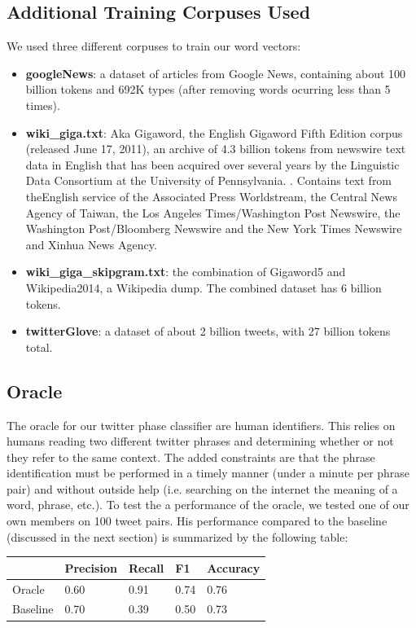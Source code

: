 \documentclass[conference]{IEEEtran}
\begin{document}
\subsection{Additional Training Corpuses Used}
We used three different corpuses to train our word vectors:\\
\begin{itemize}
\item \textbf{googleNews}: a dataset of articles from Google News, containing about 100 billion tokens and  692K types (after removing words ocurring less than 5 times). \cite{GloVe}
\item \textbf{wiki\_giga.txt}: Aka Gigaword, the English Gigaword Fifth Edition corpus (released June 17, 2011), an archive of 4.3 billion tokens from newswire text data in English that has been acquired over several years by the Linguistic Data Consortium at the University of Pennsylvania. \cite{Gigaword}.  Contains text from theEnglish service of the Associated Press Worldstream, the Central News Agency of Taiwan, the Los Angeles Times/Washington Post Newswire, the Washington Post/Bloomberg Newswire and the New York Times Newswire and Xinhua News Agency.
\item \textbf{wiki\_giga\_skipgram.txt}: the combination of Gigaword5 and Wikipedia2014, a Wikipedia dump.  The combined dataset has 6 billion tokens. \cite{Mikolov}
\item \textbf{twitterGlove}: a dataset of about 2 billion tweets, with 27 billion tokens total. \cite{GloVe}

\end{itemize}

\subsection{Oracle}
The oracle for our twitter phase classifier are human identifiers. This relies on humans reading two different twitter phrases and determining whether or not they refer to the same context. The added constraints are that the phrase identification must be performed in a timely manner (under a minute per phrase pair) and without outside help (i.e. searching on the internet the meaning of a word, phrase, etc.).  To test the a performance of the oracle, we tested one of our own members on 100 tweet pairs.  His performance compared to the baseline (discussed in the next section) is summarized by the following table:

\begin{table}[h]
\begin{tabular}{lllll}
         & Precision & Recall & F1   & Accuracy \\
\hline
Oracle   & 0.60      & 0.91   & 0.74 & 0.76     \\
Baseline & 0.70      & 0.39   & 0.50 & 0.73     \\ 
\end{tabular}
\end{table}
\end{document}
